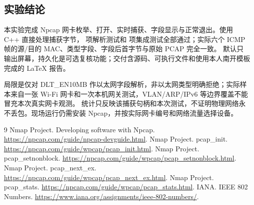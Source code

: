 \documentclass[UTF8,notitlepage,11pt]{ctexart}
\begin{document}
\subsection{实验结论}
本实验完成 Npcap 网卡枚举、打开、实时捕获、字段显示与正常退出。使用 C++ 直接处理捕获字节，
\ParserTests{} 项解析测试和 \IntegrationTests{} 项集成测试全部通过；实际六个 ICMP 帧的源/目的 MAC、类型字段、字段后首字节与原始 PCAP 完全一致。
默认只输出屏幕，持久化是可选复核功能；交付含源码、可执行文件和使用本人南开模板完成的 LaTeX 报告。

局限是仅对 DLT\_EN10MB 作以太网字段解析，非以太网类型明确拒绝；实际样本来自一张 Wi-Fi 网卡和一次本机网关测试，VLAN/ARP/IPv6 等边界覆盖不能冒充本次真实网卡观测。
统计只反映该捕获句柄和本次测试，不证明物理网络永不丢包。现场运行仍需安装 Npcap，并按实际网卡编号和网络流量选择设备。

\clearpage
{}
\begin{thebibliography}{9}
 Nmap Project. Developing software with Npcap.
\url{https://npcap.com/guide/npcap-devguide.html}.
 Nmap Project. pcap\_init.
\url{https://npcap.com/guide/wpcap/pcap_init.html}.
 Nmap Project. pcap\_setnonblock.
\url{https://npcap.com/guide/wpcap/pcap_setnonblock.html}.
 Nmap Project. pcap\_next\_ex.
\url{https://npcap.com/guide/wpcap/pcap_next_ex.html}.
 Nmap Project. pcap\_stats.
\url{https://npcap.com/guide/wpcap/pcap_stats.html}.
 IANA. IEEE 802 Numbers.
\url{https://www.iana.org/assignments/ieee-802-numbers/}.
\end{thebibliography}
\end{document}

